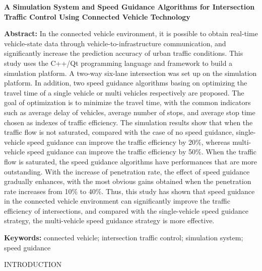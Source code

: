 \protect\hypertarget{ux5fToc470790476}{}{}\textbf{A Simulation System
and Speed Guidance Algorithms for Intersection Traffic Control Using
Connected Vehicle Technology}

\textbf{Abstract:} In the connected vehicle environment, it is possible
to obtain real-time vehicle-state data through vehicle-to-infrastructure
communication, and significantly increase the prediction accuracy of
urban traffic conditions. This study uses the C++/Qt programming
language and framework to build a simulation platform. A two-way
six-lane intersection was set up on the simulation platform. In
addition, two speed guidance algorithms basing on optimizing the travel
time of a single vehicle or multi vehicles respectively are proposed.
The goal of optimization is to minimize the travel time, with the common
indicators such as average delay of vehicles, average number of stops,
and average stop time chosen as indexes of traffic efficiency. The
simulation results show that when the traffic flow is not saturated,
compared with the case of no speed guidance, single-vehicle speed
guidance can improve the traffic efficiency by 20\%, whereas
multi-vehicle speed guidance can improve the traffic efficiency by 50\%.
When the traffic flow is saturated, the speed guidance algorithms have
performances that are more outstanding. With the increase of penetration
rate, the effect of speed guidance gradually enhances, with the most
obvious gains obtained when the penetration rate increases from 10\% to
40\%. Thus, this study has shown that speed guidance in the connected
vehicle environment can significantly improve the traffic efficiency of
intersections, and compared with the single-vehicle speed guidance
strategy, the multi-vehicle speed guidance strategy is more effective.

\textbf{Keywords:} connected vehicle; intersection traffic control;
simulation system; speed guidance

\textsc{INTRODUCTION}

